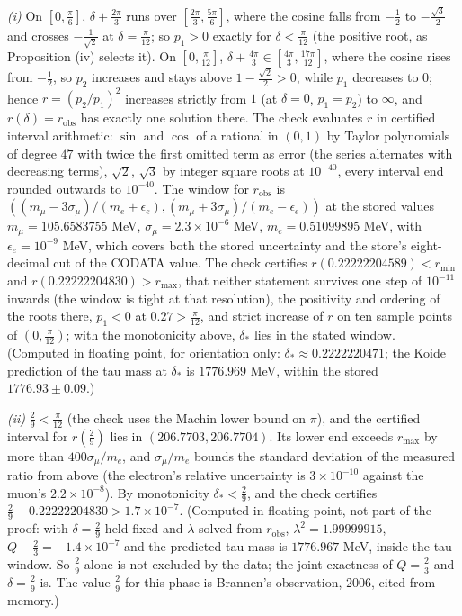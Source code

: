 \emph{(i)} On $[0, \tfrac{\pi}{6}]$, $\delta + \tfrac{2\pi}{3}$ runs over $[\tfrac{2\pi}{3}, \tfrac{5\pi}{6}]$, where the cosine falls from $-\tfrac12$ to $-\tfrac{\sqrt3}{2}$ and crosses $-\tfrac{1}{\sqrt2}$ at $\delta = \tfrac{\pi}{12}$; so $p_{1} > 0$ exactly for $\delta < \tfrac{\pi}{12}$ (the positive root, as Proposition (iv) selects it). On $[0, \tfrac{\pi}{12}]$, $\delta + \tfrac{4\pi}{3} \in [\tfrac{4\pi}{3}, \tfrac{17\pi}{12}]$, where the cosine rises from $-\tfrac12$, so $p_{2}$ increases and stays above $1 - \tfrac{\sqrt2}{2} > 0$, while $p_{1}$ decreases to $0$; hence $r = (p_{2}/p_{1})^{2}$ increases strictly from $1$ (at $\delta = 0$, $p_{1} = p_{2}$) to $\infty$, and $r(\delta) = r_{\mathrm{obs}}$ has exactly one solution there. The check evaluates $r$ in certified interval arithmetic: $\sin$ and $\cos$ of a rational in $(0, 1)$ by Taylor polynomials of degree $47$ with twice the first omitted term as error (the series alternates with decreasing terms), $\sqrt2$, $\sqrt3$ by integer square roots at $10^{-40}$, every interval end rounded outwards to $10^{-40}$. The window for $r_{\mathrm{obs}}$ is $((m_{\mu} - 3\sigma_{\mu})/(m_{e} + \epsilon_{e}), (m_{\mu} + 3\sigma_{\mu})/(m_{e} - \epsilon_{e}))$ at the stored values $m_{\mu} = 105.6583755$ MeV, $\sigma_{\mu} = 2.3 \times 10^{-6}$ MeV, $m_{e} = 0.51099895$ MeV, with $\epsilon_{e} = 10^{-9}$ MeV, which covers both the stored uncertainty and the store's eight-decimal cut of the CODATA value. The check certifies $r(0.22222204589) < r_{\min}$ and $r(0.22222204830) > r_{\max}$, that neither statement survives one step of $10^{-11}$ inwards (the window is tight at that resolution), the positivity and ordering of the roots there, $p_{1} < 0$ at $0.27 > \tfrac{\pi}{12}$, and strict increase of $r$ on ten sample points of $(0, \tfrac{\pi}{12})$; with the monotonicity above, $\delta_{*}$ lies in the stated window. (Computed in floating point, for orientation only: $\delta_{*} \approx 0.2222220471$; the Koide prediction of the tau mass at $\delta_{*}$ is $1776.969$ MeV, within the stored $1776.93 \pm 0.09$.)

\emph{(ii)} $\tfrac29 < \tfrac{\pi}{12}$ (the check uses the Machin lower bound on $\pi$), and the certified interval for $r(\tfrac29)$ lies in $(206.7703, 206.7704)$. Its lower end exceeds $r_{\max}$ by more than $400\sigma_{\mu}/m_{e}$, and $\sigma_{\mu}/m_{e}$ bounds the standard deviation of the measured ratio from above (the electron's relative uncertainty is $3 \times 10^{-10}$ against the muon's $2.2 \times 10^{-8}$). By monotonicity $\delta_{*} < \tfrac29$, and the check certifies $\tfrac29 - 0.22222204830 > 1.7 \times 10^{-7}$. (Computed in floating point, not part of the proof: with $\delta = \tfrac29$ held fixed and $\lambda$ solved from $r_{\mathrm{obs}}$, $\lambda^{2} = 1.99999915$, $Q - \tfrac23 = -1.4 \times 10^{-7}$ and the predicted tau mass is $1776.967$ MeV, inside the tau window. So $\tfrac29$ alone is not excluded by the data; the joint exactness of $Q = \tfrac23$ and $\delta = \tfrac29$ is. The value $\tfrac29$ for this phase is Brannen's observation, 2006, cited from memory.)

